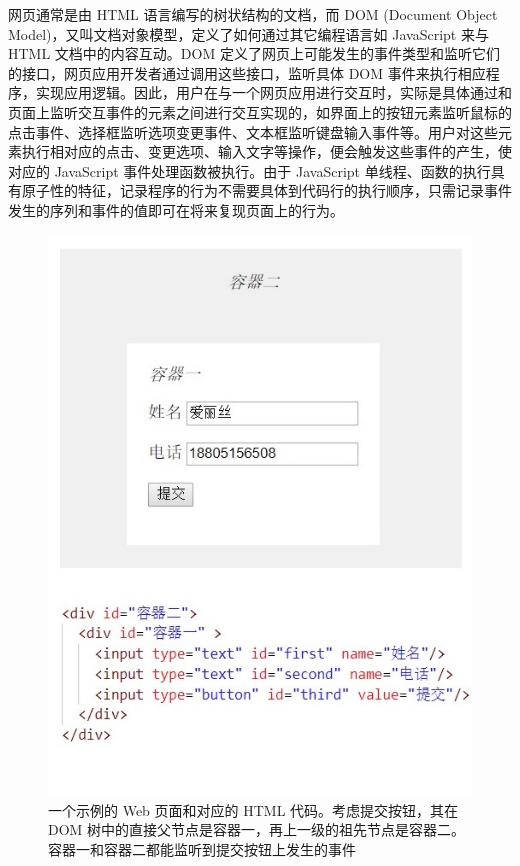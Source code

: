 \documentclass[design, pageheader]{njubachelor}
\begin{document}
网页通常是由 HTML 语言编写的树状结构的文档，而 DOM (Document Object Model)，又叫文档对象模型，定义了如何通过其它编程语言如 JavaScript 来与 HTML 文档中的内容互动。DOM 定义了网页上可能发生的事件类型和监听它们的接口，网页应用开发者通过调用这些接口，监听具体 DOM 事件来执行相应程序，实现应用逻辑。因此，用户在与一个网页应用进行交互时，实际是具体通过和页面上监听交互事件的元素之间进行交互实现的，如界面上的按钮元素监听鼠标的点击事件、选择框监听选项变更事件、文本框监听键盘输入事件等。用户对这些元素执行相对应的点击、变更选项、输入文字等操作，便会触发这些事件的产生，使对应的 JavaScript 事件处理函数被执行。由于 JavaScript 单线程、函数的执行具有原子性的特征，记录程序的行为不需要具体到代码行的执行顺序，只需记录事件发生的序列和事件的值即可在将来复现页面上的行为。

\begin{figure}
    \centering
    \includegraphics{figures/dom_case.jpg}
    \caption{一个示例的 Web 页面和对应的 HTML 代码。考虑提交按钮，其在 DOM 树中的直接父节点是容器一，再上一级的祖先节点是容器二。容器一和容器二都能监听到提交按钮上发生的事件}
    \label{fig:dom_case}
\end{figure}
\end{document}
